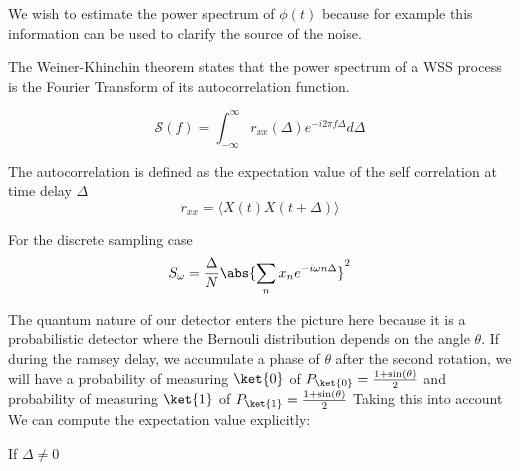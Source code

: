 We wish to estimate the power spectrum of $\phi (t)$ because for example this information can be used to clarify the source of the noise.

The Weiner-Khinchin theorem states that the power spectrum of a WSS process is the Fourier Transform of its autocorrelation function.

\begin{equation}
    \mathcal{S}(f) = \int_{-\infty}^{\infty} r_{xx} (\Delta) e^{- i 2 \pi f \Delta} d\Delta
\end{equation}

The autocorrelation is defined as the expectation value of the self correlation at time delay $\Delta$
\begin{equation}
    r_{xx} = \langle X(t) X(t+\Delta) \rangle
\end{equation}

For the discrete sampling case 
\begin{equation}
    S_{\omega} = \frac{\Delta}{N} \abs{\sum_n x_n e^{- i \omega n \Delta}}^2
\end{equation}

The quantum nature of our detector enters the picture here because it is a probabilistic detector where the Bernouli distribution depends on the angle $\theta$.
If during the ramsey delay, we accumulate a phase of $\theta$ after the second rotation, we will have
a probability of measuring $\ket{0}$ of $P_{\ket{0}} = \frac{1 + \sin (\theta)}{2}$
and probability of measuring $\ket{1}$ of $P_{\ket{1}} = \frac{1 + \sin (\theta)}{2}$
Taking this into account We can compute the expectation value explicitly:

If $\Delta \neq 0$



